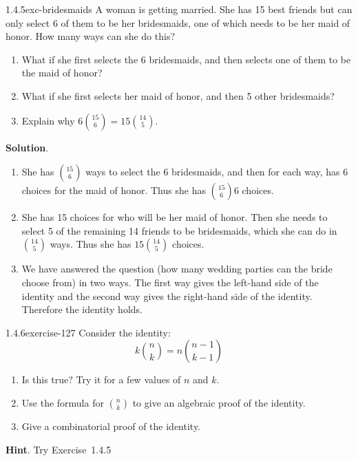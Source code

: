 \documentclass[twoside,11pt,]{book}
\numberwithin{equation}{chapter}
\begin{document}
\begin{divisionsolution}{1.4.5}{}{exc-bridesmaids}%
\hypertarget{p-2102}{}%
A woman is getting married. She has 15 best friends but can only select 6 of them to be her bridesmaids, one of which needs to be her maid of honor. How many ways can she do this?%
\leavevmode%
\begin{enumerate}[label=(\alph*)]
\item\hypertarget{li-1316}{}\hypertarget{p-2103}{}%
What if she first selects the 6 bridesmaids, and then selects one of them to be the maid of honor?%
\item\hypertarget{li-1317}{}\hypertarget{p-2104}{}%
What if she first selects her maid of honor, and then 5 other bridesmaids?%
\item\hypertarget{li-1318}{}\hypertarget{p-2105}{}%
Explain why \(6 {15 \choose 6} = 15 {14 \choose 5}\).%
\end{enumerate}
\par\smallskip%
\noindent\textbf{Solution}.\quad%
\hypertarget{p-2106}{}%
\leavevmode%
\begin{enumerate}[label=(\alph*)]
\item\hypertarget{li-1319}{}\hypertarget{p-2107}{}%
She has \({15 \choose 6}\) ways to select the 6 bridesmaids, and then for each way, has 6 choices for the maid of honor. Thus she has \({15 \choose 6}6\) choices.%
\item\hypertarget{li-1320}{}\hypertarget{p-2108}{}%
She has 15 choices for who will be her maid of honor. Then she needs to select 5 of the remaining 14 friends to be bridesmaids, which she can do in \({14 \choose 5}\) ways. Thus she has \(15 {14 \choose 5}\) choices.%
\item\hypertarget{li-1321}{}\hypertarget{p-2109}{}%
We have answered the question (how many wedding parties can the bride choose from) in two ways. The first way gives the left-hand side of the identity and the second way gives the right-hand side of the identity. Therefore the identity holds.%
\end{enumerate}
%
\end{divisionsolution}%
\begin{divisionsolution}{1.4.6}{}{exercise-127}%
\hypertarget{p-2110}{}%
Consider the identity:%
\begin{equation*}
k{n\choose k} = n{n-1 \choose k-1}
\end{equation*}
\leavevmode%
\begin{enumerate}[label=(\alph*)]
\item\hypertarget{li-1322}{}\hypertarget{p-2111}{}%
Is this true? Try it for a few values of \(n\) and \(k\).%
\item\hypertarget{li-1323}{}\hypertarget{p-2112}{}%
Use the formula for \({n \choose k}\) to give an algebraic proof of the identity.%
\item\hypertarget{li-1324}{}\hypertarget{p-2113}{}%
Give a combinatorial proof of the identity.%
\end{enumerate}
%
\par\smallskip%
\noindent\textbf{Hint}.\quad%
\hypertarget{p-2114}{}%
Try Exercise~1.4.5%
\end{divisionsolution}%
\end{document}
